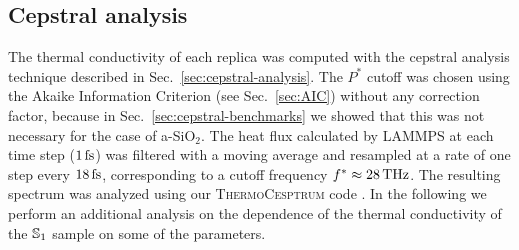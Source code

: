 \subsection{Cepstral analysis}  \label{sec:results-class-cepstral}
The thermal conductivity of each replica was computed with the cepstral analysis technique described in Sec.~\ref{sec:cepstral-analysis}. 
The $P^*$ cutoff was chosen using the Akaike Information Criterion (see Sec.~\ref{sec:AIC}) without any correction factor, because in Sec.~\ref{sec:cepstral-benchmarks} we showed that this was not necessary for the case of a-SiO$_2$. 
The heat flux calculated by \textsc{LAMMPS} at each time step ($1\,\mathrm{fs}$) was filtered with a moving average and resampled at a rate of one step every $18\,\mathrm{fs}$, corresponding to a cutoff frequency $f^*\approx 28\,\mathrm{THz}$. The resulting spectrum was analyzed using our \textsc{ThermoCesptrum} code \cite{thermocepstrum}.
In the following we perform an additional analysis on the dependence of the thermal conductivity of the $\S1$ sample on some of the parameters. 

